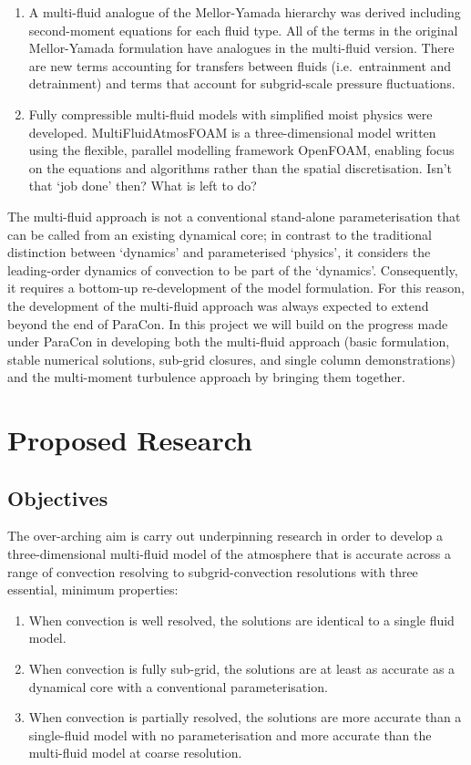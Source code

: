 \documentclass[11pt,a4paper]{article}
\begin{document}
\begin{enumerate}
\item A multi-fluid analogue of the Mellor-Yamada hierarchy was derived including second-moment equations for each fluid type. All of the terms in the original Mellor-Yamada formulation have analogues in the multi-fluid version. There are new terms accounting for transfers between fluids (i.e.\ entrainment and detrainment) and  terms that account for subgrid-scale pressure fluctuations.

\item Fully compressible multi-fluid models with simplified moist physics were developed. MultiFluidAtmosFOAM is a three-dimensional model written using the flexible, parallel modelling framework OpenFOAM, enabling focus on the equations and algorithms rather than the spatial discretisation. {\color{red} Isn't that `job done' then? What is
left to do?}

\end{enumerate}

The multi-fluid approach is not a conventional stand-alone parameterisation that can be called from an existing dynamical core; in contrast to the traditional distinction between `dynamics' and parameterised `physics', it
considers the leading-order dynamics of convection to be part of the `dynamics'. Consequently,
it requires a bottom-up re-development of the model formulation. For this reason, the development of the multi-fluid approach was always expected to extend beyond the end of ParaCon. In this project we will build on the progress made under ParaCon in developing both the multi-fluid approach (basic formulation, stable numerical solutions, sub-grid closures, and single column demonstrations) and the multi-moment turbulence approach by bringing them together.

\section{Proposed Research}

\subsection{Objectives}

The over-arching aim is carry out underpinning research in order to develop a three-dimensional multi-fluid model of the atmosphere that is accurate across a range of convection resolving to subgrid-convection resolutions with three essential, minimum properties:

\begin{enumerate}\renewcommand{\theenumi}{\alph{enumi}}
\item When convection is well resolved, the solutions are identical to a single fluid model.
\item When convection is fully sub-grid, the solutions are at least as accurate as a dynamical core with a conventional parameterisation.
\item When convection is partially resolved, the solutions are more accurate than a single-fluid model with no parameterisation and more accurate than the multi-fluid model at coarse resolution.
\end{enumerate}
\end{document}

